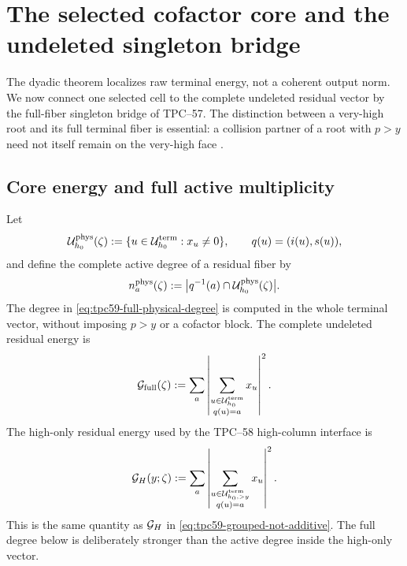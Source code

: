 \section{The selected cofactor core and the undeleted singleton bridge}
\label{sec:tpc59-singleton}

The dyadic theorem localizes raw terminal energy, not a coherent output
norm.  We now connect one selected cell to the complete undeleted residual
vector by the full-fiber singleton bridge of TPC--57.  The distinction
between a very-high root and its full terminal fiber is essential: a
collision partner of a root with \(p>y\) need not itself remain on the
very-high face \citep{WangTPC57}.

\subsection{Core energy and full active multiplicity}

Let
\begin{equation}
 \mathcal U_{h_0}^{\rm phys}(\zeta)
 :=\{u\in\mathcal U_{h_0}^{\rm term}:x_u\ne0\},
 \qquad q(u)=(i(u),s(u)),
 \label{eq:tpc59-full-physical-terminal-set}
\end{equation}
and define the complete active degree of a residual fiber by
\begin{equation}
 n_a^{\rm phys}(\zeta)
 :=\bigl|q^{-1}(a)\cap\mathcal U_{h_0}^{\rm phys}(\zeta)\bigr|.
 \label{eq:tpc59-full-physical-degree}
\end{equation}
The degree in \eqref{eq:tpc59-full-physical-degree} is computed in the
whole terminal vector, without imposing \(p>y\) or a cofactor block.
The complete undeleted residual energy is
\begin{equation}
 \mathcal G_{\rm full}(\zeta)
 :=\sum_a\left|
      \sum_{\substack{u\in\mathcal U_{h_0}^{\rm term}\\q(u)=a}}x_u
     \right|^2.
 \label{eq:tpc59-complete-grouped-energy}
\end{equation}
The high-only residual energy used by the TPC--58 high-column interface is
\begin{equation}
 \mathcal G_H(y;\zeta)
 :=\sum_a\left|
      \sum_{\substack{u\in\mathcal U_{h_0,>y}^{\rm term}\\q(u)=a}}x_u
     \right|^2.
 \label{eq:tpc59-high-only-grouped-energy}
\end{equation}
This is the same quantity as \(\mathcal G_H\) in
\eqref{eq:tpc59-grouped-not-additive}.  The full degree below is deliberately
stronger than the active degree inside the high-only vector.

